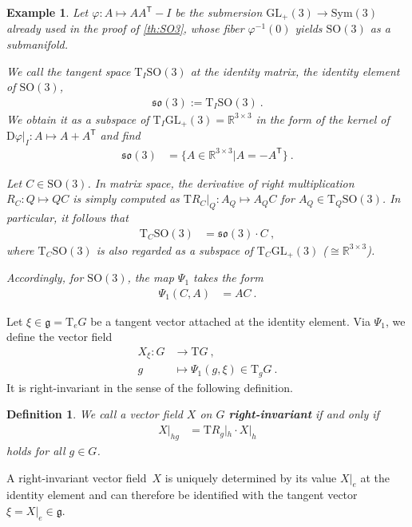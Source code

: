 \documentclass[10pt,a4paper]{article}
\theoremstyle{mytheorem}
\theoremstyle{mydefinition}
\newtheorem{definition}[theorem]{Definition}
\newtheorem{example}[theorem]{Example}
\newcommand{\mydef}[1]{\textbf{\textit{#1}}}
\newcommand{\trans}{^\mathsf{T}}
\newcommand{\Dt}{\mathrm{D}}
\newcommand{\Tt}{\mathrm{T}}
\newcommand{\SO}{\mathrm{SO}}
\newcommand{\fso}{\mathfrak{so}}
\begin{document}
\begin{example}
Let $\varphi:A\mapsto AA\trans - I$ be the submersion $\mathrm{GL}_+(3)\rightarrow\mathrm{Sym}(3)$ already used in the proof of \ref{th:SO3}, whose fiber $\varphi^{-1}(0)$ yields $\SO(3)$ as a submanifold.

We call the tangent space $\Tt_I\SO(3)$ at the identity matrix, the identity element of $\SO(3)$,
\begin{align*}
	\fso(3) := \Tt_I\SO(3)
	\ .
\end{align*}
We obtain it as a subspace of $\Tt_I\mathrm{GL}_+(3)=\mathbb{R}^{3\times 3}$ in the form of the kernel of $\Dt\varphi|_I:A\mapsto A+A\trans$ and find
\begin{align*}
	\fso(3) &= 
	\big\{
		A\in\mathbb{R}^{3\times 3}
		\big| 	
		A = -A\trans
	\big\}
	\ .
\end{align*}

Let $C\in\SO(3)$.
In matrix space, the derivative of right multiplication $R_C:Q\mapsto QC$ is simply computed as $\Tt R_C|_Q:A_Q\mapsto A_QC$ for $A_Q\in\Tt_Q\SO(3)$.
In particular, it follows that
\begin{align*}
	\Tt_C\SO(3) &= \fso(3)\cdot C
	\ ,
\end{align*}
where $\Tt_C\SO(3)$ is also regarded as a subspace of $\Tt_C\mathrm{GL}_+(3)$ ($\cong\mathbb{R}^{3\times 3}$).

Accordingly, for $\SO(3)$, the map $\Psi_1$ takes the form
\begin{align*}
	\Psi_1(C, A) &= AC
	\ .
\end{align*}
\end{example}

Let $\xi\in\mathfrak{g}=\Tt_eG$ be a tangent vector attached at the identity element.
Via $\Psi_1$, we define the vector field
\begin{align*}
	X_\xi: G &\rightarrow \Tt G
	\ ,\nonumber\\
	g &\mapsto \Psi_1(g, \xi)\in\Tt_g G
	\ .
\end{align*}
It is right-invariant in the sense of the following definition.

\begin{definition}
We call a vector field $X$ on $G$ \mydef{right-invariant} if and only if
\begin{align*}
	X|_{hg} &= \Tt R_g|_h\cdot X|_{h}
\end{align*}
holds for all $g\in G$.
\end{definition}

A right-invariant vector field~$X$ is uniquely determined by its value $X|_e$ at the identity element and can therefore be identified with the tangent vector $\xi=X|_e\in\mathfrak{g}$.
\end{document}
